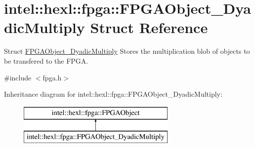\hypertarget{structintel_1_1hexl_1_1fpga_1_1FPGAObject__DyadicMultiply}{\section{intel\-:\-:hexl\-:\-:fpga\-:\-:F\-P\-G\-A\-Object\-\_\-\-Dyadic\-Multiply Struct Reference}
\label{structintel_1_1hexl_1_1fpga_1_1FPGAObject__DyadicMultiply}
}


Struct \hyperlink{structintel_1_1hexl_1_1fpga_1_1FPGAObject__DyadicMultiply}{F\-P\-G\-A\-Object\-\_\-\-Dyadic\-Multiply} Stores the multiplication blob of objects to be transfered to the F\-P\-G\-A.  




{\ttfamily \#include $<$fpga.\-h$>$}

Inheritance diagram for intel\-:\-:hexl\-:\-:fpga\-:\-:F\-P\-G\-A\-Object\-\_\-\-Dyadic\-Multiply\-:\begin{figure}[H]
\begin{center}
\leavevmode
\includegraphics[height=2.000000cm]{structintel_1_1hexl_1_1fpga_1_1FPGAObject__DyadicMultiply}
\end{center}
\end{figure}
